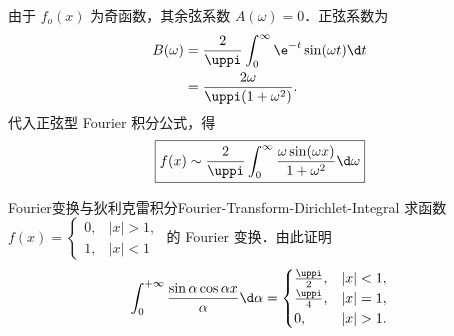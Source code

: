 \begin{solution}
    由于 $f_o(x)$ 为奇函数，其余弦系数 $A(\omega) = 0$．正弦系数为
    \begin{equation}
        \begin{aligned}
            B(\omega) & = \frac{2}{\uppi} \int_{0}^{\infty} \e^{-t} \sin(\omega t) \d t \\
                      & = \frac{2\omega}{\uppi (1+\omega^2)}.
        \end{aligned}
    \end{equation}
    代入正弦型 Fourier 积分公式，得
    \begin{equation}
        \boxed{f(x) \sim \frac{2}{\uppi} \int_0^\infty \frac{\omega \sin(\omega x)}{1+\omega^2} \d\omega}
    \end{equation}
\end{solution}

\begin{problem}{Fourier变换与狄利克雷积分}{Fourier-Transform-Dirichlet-Integral}
    求函数 $f(x) = \begin{cases} 0, & |x| > 1, \\ 1, & |x| < 1 \end{cases}$ 的 Fourier 变换．由此证明
    \begin{equation}
        \int_{0}^{+\infty} \frac{\sin \alpha \cos \alpha x}{\alpha} \d\alpha = \begin{cases} \frac{\uppi}{2}, & |x| < 1, \\ \frac{\uppi}{4}, & |x| = 1, \\ 0, & |x| > 1. \end{cases}
    \end{equation}
\end{problem}

